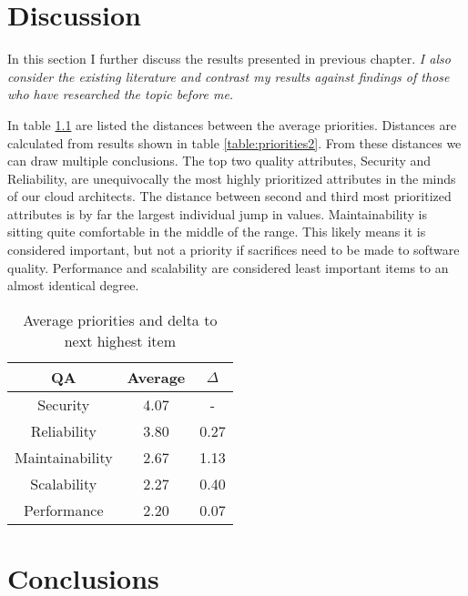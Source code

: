 \documentclass[utf8,english]{gradu3}
\newcommand{\tmp}[1]{\textit{{#1}}}
\begin{document}
\chapter{Discussion}

In this section I further discuss the results presented in previous chapter.
\tmp{I also consider the existing literature and contrast my results against findings of those who have researched the topic before me.}


In table \ref{table:priorities3} are listed the distances between the average priorities.
Distances are calculated from results shown in table \ref{table:priorities2}.
From these distances we can draw multiple conclusions.
The top two quality attributes, Security and Reliability, are unequivocally the most highly prioritized attributes in the minds of our cloud architects.
The distance between second and third most prioritized attributes is by far the largest individual jump in values.
Maintainability is sitting quite comfortable in the middle of the range.
This likely means it is considered important, but not a priority if sacrifices need to be made to software quality.
Performance and scalability are considered least important items to an almost identical degree.

\begin{table}[!h]
  \begin{center}
    \caption{Average priorities and delta to next highest item}
    \label{table:priorities3}
    \begin{tabular}{|c|c|c|}
      \hline
      \textbf{QA}     & \textbf{Average} & \textbf{$\Delta$} \\
      \hline
      Security        & 4.07             & -                 \\
      Reliability     & 3.80             & 0.27              \\
      Maintainability & 2.67             & 1.13              \\
      Scalability     & 2.27             & 0.40              \\
      Performance     & 2.20             & 0.07              \\
      \hline
    \end{tabular}
  \end{center}
\end{table}

\chapter{Conclusions}


\printbibliography

\nocite{*}

\appendix
\end{document}
